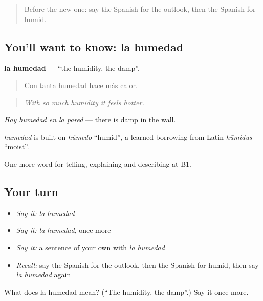 \label{lesson:ES-C696-humedad}



\begin{quote}
Before the new one: say the Spanish for the outlook, then the Spanish for humid.
\end{quote}

\subsection*{You'll want to know: la humedad}
\textbf{la humedad} — \textquotedblleft{}the humidity, the damp\textquotedblright{}.

\begin{quote}
Con tanta humedad hace más calor.
\end{quote}

\begin{quote}
\emph{With so much humidity it feels hotter.}
\end{quote}

\emph{Hay humedad en la pared} — there is damp in the wall.

\begin{cousinweb}
\emph{humedad} is built on \emph{húmedo} \textquotedblleft{}humid\textquotedblright{}, a learned borrowing from Latin \emph{hūmidus} \textquotedblleft{}moist\textquotedblright{}.
\end{cousinweb}

\begin{grammarlens}[title={What you've built}]
One more word for telling, explaining and describing at B1.
\end{grammarlens}

\subsection*{Your turn}
\begin{itemize}
\raggedright
  \item \emph{Say it:} \emph{la humedad}
  \item \emph{Say it:} \emph{la humedad}, once more
  \item \emph{Say it:} a sentence of your own with \emph{la humedad}
  \item \emph{Recall:} say the Spanish for the outlook, then the Spanish for humid, then say \emph{la humedad} again
\end{itemize}

\begin{tcolorbox}[breakable,colback=teal!4,colframe=teal!35!black,title={Before you move on}]
What does la humedad mean? (\textquotedblleft{}The humidity, the damp\textquotedblright{}.) Say it once more.
\end{tcolorbox}
